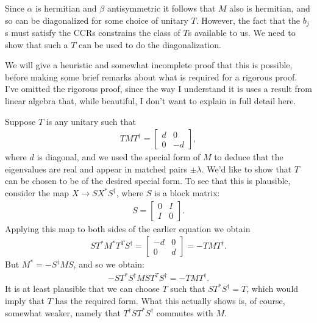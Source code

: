 \documentclass[12pt]{article}
\begin{document}
{Since $\alpha$ is hermitian and $\beta$ antisymmetric it follows that
$M$ also is hermitian, and so can be diagonalized for some choice of
unitary $T$.  However, the fact that the $b_j$s must satisfy the CCRs
constrains the class of $T$s available to us.  We need to show that
such a $T$ can be used to do the diagonalization.

We will give a heuristic and somewhat incomplete proof that this is
possible, before making some brief remarks about what is required for
a rigorous proof. I've omitted the rigorous proof, since the way I
understand it is uses a result from linear algebra that, while
beautiful, I don't want to explain in full detail here.

Suppose $T$ is any unitary such that
\begin{eqnarray}
  T M T^\dagger = \left[ \begin{array}{cc} d & 0 \\ 0 & -d \end{array} \right],
\end{eqnarray}
where $d$ is diagonal, and we used the special form of $M$ to deduce
that the eigenvalues are real and appear in matched pairs $\pm
\lambda$.  We'd like to show that $T$ can be chosen to be of the
desired special form.  To see that this is plausible, consider the map
$X \rightarrow S X^* S^\dagger$, where $S$ is a block matrix:
\begin{eqnarray}
  S = \left[ \begin{array}{cc} 0 & I \\ I & 0 \end{array} \right].
\end{eqnarray}
Applying this map to both sides of the earlier equation we obtain
\begin{eqnarray}
  ST^* M^* T^T S^\dagger = 
\left[ \begin{array}{cc} -d & 0 \\ 0 & d \end{array} \right] = -TMT^\dagger.
\end{eqnarray}
But $M^* = -S^\dagger M S$, and so we obtain:
\begin{eqnarray}
  -ST^* S^\dagger M S T^T S^\dagger = -TMT^\dagger.
\end{eqnarray}
It is at least plausible that we can choose $T$ such that
$ST^*S^\dagger = T$, which would imply that $T$ has the required form.
What this actually shows is, of course, somewhat weaker, namely that
$T^\dagger ST^* S^\dagger$ commutes with $M$.  

}
\end{document}
